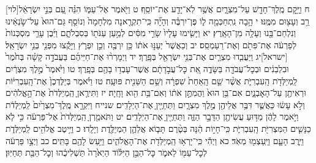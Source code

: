 \documentclass[twoside, openany, parskip=half, 11pt]{book}
\begin{document}
[לוי]ח וַיָּ֥קׇם מֶֽלֶךְ־חָדָ֖שׁ עַל־מִצְרָ֑יִם אֲשֶׁ֥ר לֹֽא־יָדַ֖ע אֶת־יוֹסֵֽף׃ ט וַיֹּ֖אמֶר אֶל־עַמּ֑וֹ הִנֵּ֗ה עַ֚ם בְּנֵ֣י יִשְׂרָאֵ֔ל רַ֥ב וְעָצ֖וּם מִמֶּֽנּוּ׃ י הָ֥בָה נִֽתְחַכְּמָ֖ה ל֑וֹ פֶּן־יִרְבֶּ֗ה וְהָיָ֞ה כִּֽי־תִקְרֶ֤אנָה מִלְחָמָה֙ וְנוֹסַ֤ף גַּם־הוּא֙ עַל־שֹׂ֣נְאֵ֔ינוּ וְנִלְחַם־בָּ֖נוּ וְעָלָ֥ה מִן־הָאָֽרֶץ׃ יא וַיָּשִׂ֤ימוּ עָלָיו֙ שָׂרֵ֣י מִסִּ֔ים לְמַ֥עַן עַנֹּת֖וֹ בְּסִבְלֹתָ֑ם וַיִּ֜בֶן עָרֵ֤י מִסְכְּנוֹת֙ לְפַרְעֹ֔ה אֶת־פִּתֹ֖ם וְאֶת־רַעַמְסֵֽס׃ יב וְכַאֲשֶׁר֙ יְעַנּ֣וּ אֹת֔וֹ כֵּ֥ן יִרְבֶּ֖ה וְכֵ֣ן יִפְרֹ֑ץ וַיָּקֻ֕צוּ מִפְּנֵ֖י בְּנֵ֥י יִשְׂרָאֵֽל׃ [ישראל]יג וַיַּעֲבִ֧דוּ מִצְרַ֛יִם אֶת־בְּנֵ֥י יִשְׂרָאֵ֖ל בְּפָֽרֶךְ׃ יד וַיְמָרְר֨וּ אֶת־חַיֵּיהֶ֜ם בַּעֲבֹדָ֣ה קָשָׁ֗ה בְּחֹ֙מֶר֙ וּבִלְבֵנִ֔ים וּבְכׇל־עֲבֹדָ֖ה בַּשָּׂדֶ֑ה אֵ֚ת כׇּל־עֲבֹ֣דָתָ֔ם אֲשֶׁר־עָבְד֥וּ בָהֶ֖ם בְּפָֽרֶךְ׃ טו וַיֹּ֙אמֶר֙ מֶ֣לֶךְ מִצְרַ֔יִם לַֽמְיַלְּדֹ֖ת הָֽעִבְרִיֹּ֑ת אֲשֶׁ֨ר שֵׁ֤ם הָֽאַחַת֙ שִׁפְרָ֔ה וְשֵׁ֥ם הַשֵּׁנִ֖ית פּוּעָֽה׃ טז וַיֹּ֗אמֶר בְּיַלֶּדְכֶן֙ אֶת־הָֽעִבְרִיּ֔וֹת וּרְאִיתֶ֖ן עַל־הָאׇבְנָ֑יִם אִם־בֵּ֥ן הוּא֙ וַהֲמִתֶּ֣ן אֹת֔וֹ וְאִם־בַּ֥ת הִ֖וא וָחָֽיָה׃ יז וַתִּירֶ֤אןָ הַֽמְיַלְּדֹת֙ אֶת־הָ֣אֱלֹהִ֔ים וְלֹ֣א עָשׂ֔וּ כַּאֲשֶׁ֛ר דִּבֶּ֥ר אֲלֵיהֶ֖ן מֶ֣לֶךְ מִצְרָ֑יִם וַתְּחַיֶּ֖יןָ אֶת־הַיְלָדִֽים׃ שנייח וַיִּקְרָ֤א מֶֽלֶךְ־מִצְרַ֙יִם֙ לַֽמְיַלְּדֹ֔ת וַיֹּ֣אמֶר לָהֶ֔ן מַדּ֥וּעַ עֲשִׂיתֶ֖ן הַדָּבָ֣ר הַזֶּ֑ה וַתְּחַיֶּ֖יןָ אֶת־הַיְלָדִֽים׃ יט וַתֹּאמַ֤רְןָ הַֽמְיַלְּדֹת֙ אֶל־פַּרְעֹ֔ה כִּ֣י לֹ֧א כַנָּשִׁ֛ים הַמִּצְרִיֹּ֖ת הָֽעִבְרִיֹּ֑ת כִּֽי־חָי֣וֹת הֵ֔נָּה בְּטֶ֨רֶם תָּב֧וֹא אֲלֵהֶ֛ן הַמְיַלֶּ֖דֶת וְיָלָֽדוּ׃ כ וַיֵּ֥יטֶב אֱלֹהִ֖ים לַֽמְיַלְּדֹ֑ת וַיִּ֧רֶב הָעָ֛ם וַיַּֽעַצְמ֖וּ מְאֹֽד׃ כא וַיְהִ֕י כִּֽי־יָרְא֥וּ הַֽמְיַלְּדֹ֖ת אֶת־הָאֱלֹהִ֑ים וַיַּ֥עַשׂ לָהֶ֖ם בָּתִּֽים׃ כב וַיְצַ֣ו פַּרְעֹ֔ה לְכׇל־עַמּ֖וֹ לֵאמֹ֑ר כׇּל־הַבֵּ֣ן הַיִּלּ֗וֹד הַיְאֹ֙רָה֙ תַּשְׁלִיכֻ֔הוּ וְכׇל־הַבַּ֖ת תְּחַיּֽוּן׃
\end{document}
